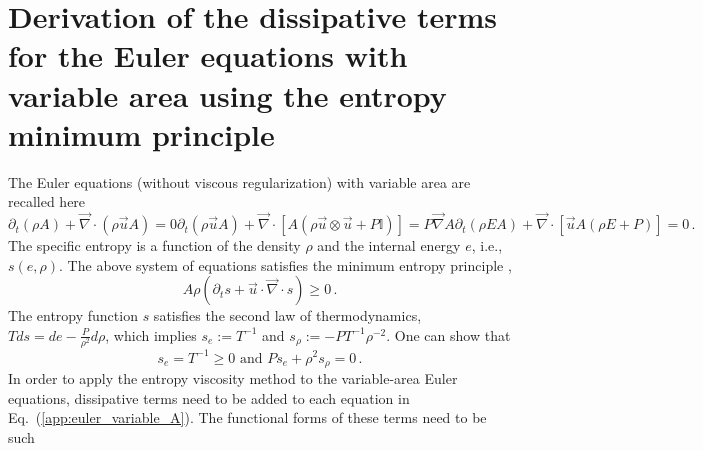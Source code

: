\documentclass[preprint,10pt]{elsarticle}
\renewcommand{\div}{\vec{\nabla}\! \cdot \!}
\newcommand{\grad}{\vec{\nabla}}
\newcommand{\eqt}[1]{Eq.~(\ref{#1})}                     %
\begin{document}
\newpage
\section{Derivation of the dissipative terms for the Euler equations with variable area using the entropy minimum principle} \label{app:diss_terms}
%
The Euler equations (without viscous regularization) with variable area are recalled here
%
\begin{subequations}
\label{app:euler_variable_A}
%
\begin{equation}
\partial_t \left( \rho A \right) + \div \left( \rho \vec{u} A \right) = 0 
\end{equation}
%
\begin{equation}
\partial_t \left( \rho \vec{u} A \right) + \div \left[A\left( \rho \vec{u} \otimes \vec{u} + P \mathbb{I} \right) \right] = P \grad A 
\end{equation}
% 
\begin{equation}
\partial_t \left( \rho E A \right) + \div \left[ \vec{u} A \left( \rho E + P \right) \right] = 0 \,.
\end{equation}
\end{subequations}
%
The specific entropy is a function of the density $\rho$ and the internal energy $e$, i.e., $s(e,\rho)$. The 
above system of equations satisfies the minimum entropy principle \cite{Leveque},
%
\begin{equation}
A \rho \left( \partial_t s + \vec{u} \cdot \div s \right) \geq 0 \, .
\end{equation}
%
The entropy function $s$ satisfies the second law of thermodynamics, $T ds = de - \frac{P}{\rho^2} d \rho$, 
which implies $s_e := T^{-1}$ and $s_\rho := -P T^{-1} \rho^{-2}$. One can show that \cite{jlg}
%
\begin{equation}
s_e = T^{-1} \geq 0 \text{ and }
Ps_e + \rho^2 s_{\rho} = 0 \,.
\end{equation}
%
In order to apply the entropy viscosity method to the variable-area Euler equations, dissipative terms need to 
be added to each equation in \eqt{app:euler_variable_A}. The functional forms of these terms need to be such 
\end{document}
